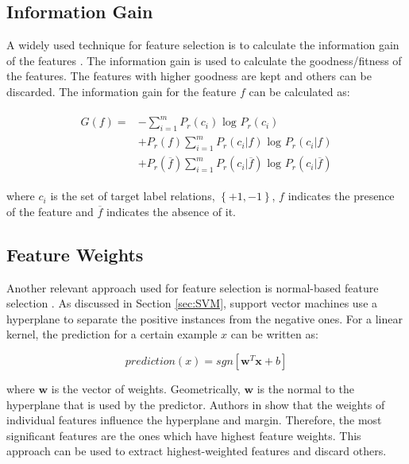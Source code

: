 \subsection{Information Gain}\label{subsec:IG}

A widely used technique for feature selection is to calculate the information gain of the features \cite{yang1997comparative}. The information gain is used to calculate the goodness/fitness of the features. The features with higher goodness are kept and others can be discarded. The information gain for the feature $f$ can be calculated as:

\begin{align}
\begin{aligned}
 G \left( f \right) = & -  \sum^m_{i=1} P_r(c_i) \text{ log } P_r(c_i) \\
  & + P_r(f) \sum^m_{i=1} P_r(c_i|f) \text{ log } P_r(c_i|f)\\
  & +  P_r(\overline{f}) \sum^m_{i=1} P_r(c_i|\overline{f}) \text{ log } P_r(c_i|\overline{f})
\end{aligned}
\end{align}

where $c_i$ is the set of target label relations, $\left\lbrace +1, -1 \right\rbrace$, $f$ indicates the presence of the feature and $\overline{f}$ indicates the absence of it.

\subsection{Feature Weights}\label{subsec:FWR}

Another relevant approach used for feature selection is normal-based feature selection \cite{brank2002feature}. As discussed in Section \ref{sec:SVM}, support vector machines use a hyperplane to separate the positive instances from the negative ones. For a linear kernel, the prediction for a certain example $x$ can be written as:

$$
prediction(x) = sgn \left[ \mathbf{w}^T\mathbf{x} + b \right]
$$

where $\mathbf{w}$ is the vector of weights. Geometrically, $\mathbf{w}$ is the normal to the hyperplane that is used by the predictor. Authors in \cite{brank2002feature} show that the weights of individual features influence the hyperplane and margin. Therefore, the most significant features are the ones which have highest feature weights. This approach can be used to extract highest-weighted features and discard others.

